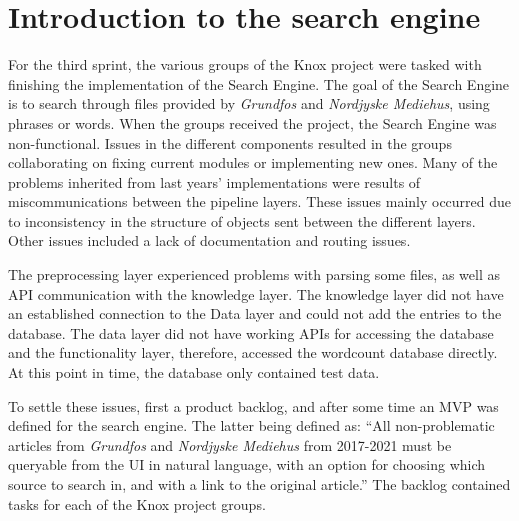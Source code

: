 \section{Introduction to the search engine}\label{SHARED-search-engine}

For the third sprint, the various groups of the Knox project were tasked with finishing the implementation of the Search Engine. The goal of the Search Engine is to search through files provided by \textit{Grundfos} and \textit{Nordjyske Mediehus}, using phrases or words. When the groups received the project, the Search Engine was non-functional. Issues in the different components resulted in the groups collaborating on fixing current modules or implementing new ones. Many of the problems inherited from last years' implementations were results of miscommunications between the pipeline layers. These issues mainly occurred due to inconsistency in the structure of objects sent between the different layers. Other issues included a lack of documentation and routing issues. 

The preprocessing layer experienced problems with parsing some files, as well as API communication with the knowledge layer. The knowledge layer did not have an established connection to the Data layer and could not  add the entries to the database. The data layer did not have working APIs for accessing the database and the functionality layer, therefore, accessed the wordcount database directly. At this point in time, the database only contained test data.

To settle these issues, first a product backlog, and after some time an MVP was defined for the search engine. The latter being defined as: “All non-problematic articles from \textit{Grundfos} and \textit{Nordjyske Mediehus} from 2017-2021 must be queryable from the UI in natural language, with an option for choosing which source to search in, and with a link to the original article.” 
The backlog contained tasks for each of the Knox project groups.